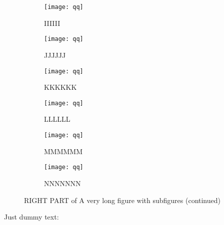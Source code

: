 \documentclass[12pt,a4paper,twoside]{book}
\newenvironment{mysubfig}
{\begin{subfigure}{0.5\linewidth}\centering}
{\end{subfigure}}
\begin{document}
\begin{figure} \ContinuedFloat %
 \begin{fullpage}
  \begin{mysubfig}   %
     \texttt{[image: qq]}
     \caption{IIIIII}\label{fig:I}
  \end{mysubfig} 
  \begin{mysubfig}   %
     \texttt{[image: qq]}
     \caption{JJJJJJ}\label{fig:J}
  \end{mysubfig} 
  \begin{mysubfig}   %
     \texttt{[image: qq]}
     \caption{KKKKKK}\label{fig:K}
  \end{mysubfig} 
  \begin{mysubfig}   %
     \texttt{[image: qq]}
     \caption{LLLLLL}\label{fig:L}
  \end{mysubfig} 
  \begin{mysubfig}   %
     \texttt{[image: qq]}
     \caption{MMMMMM}\label{fig:M}
  \end{mysubfig} 
  \begin{mysubfig}   %
     \texttt{[image: qq]}
     \caption{NNNNNNN}\label{fig:N}
  \end{mysubfig} 
  \caption{RIGHT PART of A very long figure with subfigures (continued)} %

 \end{fullpage}
\end{figure}

Just dummy text: \lipsum[1-2]


\end{document}
